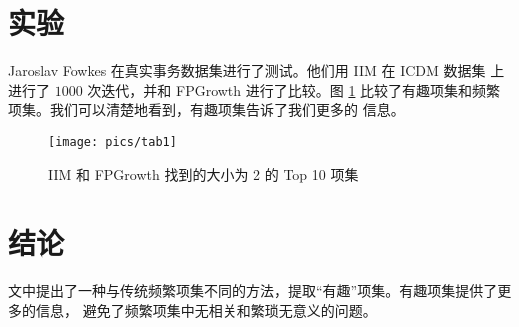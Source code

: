\documentclass{ctexart}
\begin{document}
\section{实验}
Jaroslav Fowkes 在真实事务数据集进行了测试。他们用 IIM 在 ICDM 数据集 \cite{DeBie} 上进行了 $1000$ 次迭代，并和
FPGrowth 进行了比较。图 \ref{fig:tab1} 比较了有趣项集和频繁项集。我们可以清楚地看到，有趣项集告诉了我们更多的
信息。

\begin{figure}
\centering
\texttt{[image: pics/tab1]}
\caption{IIM 和 FPGrowth 找到的大小为 2 的 Top 10 项集}
\label{fig:tab1}
\end{figure}

\section{结论}
文中提出了一种与传统频繁项集不同的方法，提取“有趣”项集。有趣项集提供了更多的信息，
避免了频繁项集中无相关和繁琐无意义的问题。

\pagebreak

\end{document}
